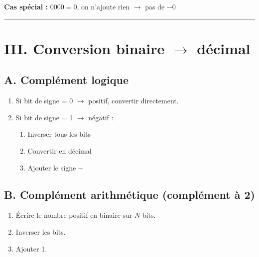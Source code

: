 \documentclass[a4paper,12pt]{article}
\begin{document}
  

\textbf{Cas spécial :} $0000 = 0$, on n’ajoute rien $\rightarrow$ pas de $-0$ 

  

\hrule
\section*{III. Conversion binaire $\rightarrow$ décimal} 

  

\subsection*{A. Complément logique} 

\begin{enumerate} 

    \item Si bit de signe = 0 $\rightarrow$ positif, convertir directement. 

    \item Si bit de signe = 1 $\rightarrow$ négatif : 

    \begin{enumerate} 

        \item Inverser tous les bits 

        \item Convertir en décimal 

        \item Ajouter le signe $-$ 

    \end{enumerate} 

\end{enumerate} 

  

\subsection*{B. Complément arithmétique (complément à 2)} 

\begin{enumerate} 

    \item Écrire le nombre positif en binaire sur $N$ bits. 

    \item Inverser les bits. 

    \item Ajouter 1. 

\end{enumerate} 
\end{document}
